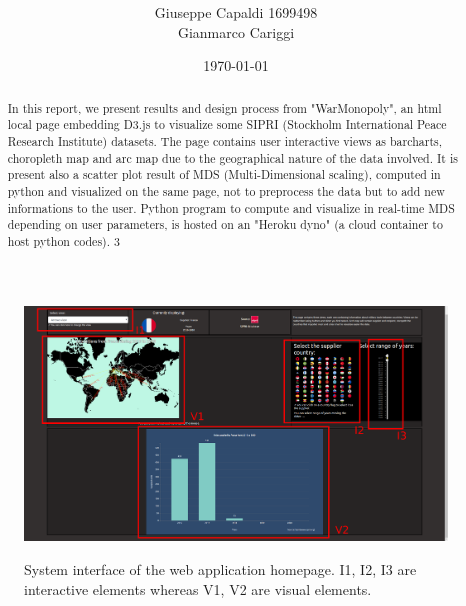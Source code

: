 \documentclass{article}
\title{\vspace{-2.0cm}\spacecaps{WarInspector: Visual Analytics web application on Arms Transfer}\\ \normalsize \spacesc{Visual Analytics Course Sapienza University of Rome} }
\author{Giuseppe Capaldi 1699498\\ Gianmarco Cariggi}
\date{\today}
\begin{document}
\maketitle
\begin{abstract}

In this report, we present results and design process from "WarMonopoly", an html local page embedding D3.js to visualize some SIPRI (Stockholm International Peace Research Institute) datasets. The page contains user interactive views as barcharts, choropleth map and arc map due to the geographical nature of the data involved. It is present also a scatter plot result of MDS (Multi-Dimensional scaling), computed in python and visualized on the same
 page, not to preprocess the data but to add new informations to the user. Python program to compute and visualize in real-time MDS depending on user parameters, is hosted on an "Heroku dyno" (a cloud container to host python codes).
3

%
\end{abstract}

    


\begin{figure}[ht!]
\centering
\includegraphics[scale=0.25,center]{./fig/va.png}
   \label{fig:va}
    \caption{System interface of the web application homepage. I1, I2, I3 are interactive elements whereas V1, V2 are visual elements. }

\end{figure}
    
\end{document}
